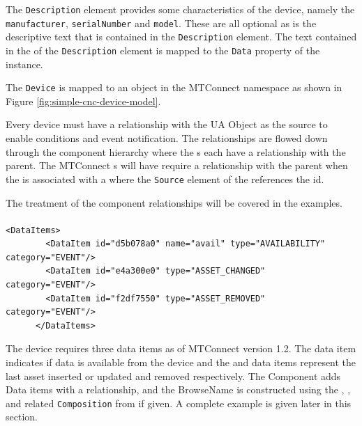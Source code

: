 The \texttt{Description} element provides some characteristics of the device, namely the \texttt{manufacturer}, \texttt{serialNumber} and \texttt{model}. These are all optional as is the descriptive text that is contained in the \texttt{Description} element. The text contained in the  of the \texttt{Description} element is mapped to the \texttt{Data} property of the  instance.

The \texttt{Device} is mapped to an  object in the MTConnect namespace as shown in Figure \ref{fig:simple-cnc-device-model}.



Every device must have a  relationship with the  UA Object as the source to enable conditions and event notification. The  relationships are flowed down through the component hierarchy where the s each have a  relationship with the parent. The MTConnect s will have require a  relationship with the parent  when the  is associated with a  where the \texttt{Source} element of the  references the  id. 

The treatment of the component relationships will be covered in the  examples.

\paragraph{ }

\begin{lstlisting}[firstnumber=last,%
    caption={Device Data Items},label={lst:device-data-items}]
      <DataItems>
        <DataItem id="d5b078a0" name="avail" type="AVAILABILITY" category="EVENT"/>
        <DataItem id="e4a300e0" type="ASSET_CHANGED" category="EVENT"/>
        <DataItem id="f2df7550" type="ASSET_REMOVED" category="EVENT"/>
      </DataItems>
\end{lstlisting}

The device requires three data items as of MTConnect version 1.2. The  data item indicates if data is available from the device and the  and  data items represent the last asset inserted or updated and removed respectively. The Component adds Data items with a  relationship, and the BrowseName is constructed using the , , and related \texttt{Composition} from  if given. A complete example is given later in this section.


